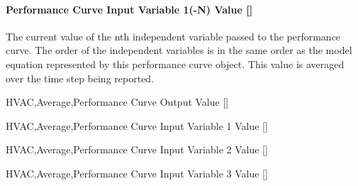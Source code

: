 \paragraph{Performance Curve Input Variable 1(-N) Value {[]}}\label{performance-curve-input-variable-1-n-value}

The current value of the nth independent variable passed to the performance curve. The order of the independent variables is in the same order as the model equation represented by this performance curve object. This value is averaged over the time step being reported.

HVAC,Average,Performance Curve Output Value {[]}

HVAC,Average,Performance Curve Input Variable 1 Value {[]}

HVAC,Average,Performance Curve Input Variable 2 Value {[]}

HVAC,Average,Performance Curve Input Variable 3 Value {[]}
